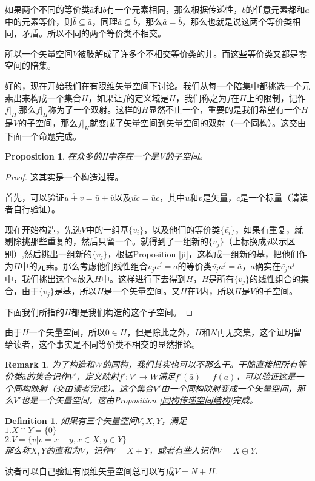 \documentclass[11pt,a4paper,openany]{book}%
\theoremstyle{plain}%
\newtheorem{pro}{Proposition}[chapter]%
\newtheorem*{rem}{Remark}%
\newtheorem{defi}{Definition}[chapter]%
\begin{document}
如果两个不同的等价类$\bar{a}$和$\bar{b}$有一个元素相同，那么根据传递性，$b$的任意元素都和$a$中的元素等价，则$\bar{b}\subseteq \bar{a}$，同理$\bar{a}\subseteq \bar{b}$，那么$\bar{a}=\bar{b}$，那么也就是说这两个等价类相同，矛盾。所以不同的两个等价类不相交。

所以一个矢量空间$V$被肢解成了许多个不相交等价类的并。而这些等价类又都是零空间的陪集。

好的，现在开始我们在有限维矢量空间下讨论。我们从每一个陪集中都挑选一个元素出来构成一个集合$H$，如果让$f$的定义域是$H$，我们称之为$f$在$H$上的限制，记作$f|_H$.那么$f|_H$称为了一个双射。这样的$H$显然不止一个，重要的是我们希望有一个$H$是$V$的子空间，那么$f|_H$就变成了矢量空间到矢量空间的双射（一个同构）。这交由下面一个命题完成。
\begin{pro}
在众多的H中存在一个是V的子空间。
\label{a-1}
\end{pro}
\begin{proof}
这其实是一个构造过程。

首先，可以验证$\overline{u+v}=\bar{u}+\bar{v}$以及$\overline{uc}=\bar{u}c$，其中$u$和$v$是矢量，$c$是一个标量（请读者自行验证）。

现在开始构造，先选$V$中的一组基$\{v_i\}$，以及他们的等价类$\{\bar{v_i}\}$，如果有重复，就剔除挑那些重复的，然后只留一个。就得到了一组新的$\{\bar{v_j}\}$（上标换成$j$以示区别）,然后挑出一组新的$\{v_j\}$，根据Proposition \ref{ji}，这构成一组新的基，把他们作为$H$中的元素。那么考虑他们线性组合$v_ja^j=a$的等价类$\bar{v_j}a^j=\bar{a}$，$a$确实在$\bar{v_j}a^j$中，我们挑出这个$a$放入$H$中。这样进行下去得到$H$，$H$是所有$\{v_j\}$的线性组合的集合，由于$\{v_j\}$是基，所以$H$是一个矢量空间。又$H$在$V$内，所以$H$是$V$的子空间。

下面我们所指的$H$都是我们构造的这个子空间。
\end{proof}
由于$H$一个矢量空间，所以$0 \in H$，但是除此之外，$H$和$N$再无交集，这个证明留给读者，这个事实是不同等价类不相交的显然推论。
\begin{rem}
为了构造和$W$的同构，我们其实也可以不那么干。干脆直接把所有等价类$\bar{a}$的集合记作$V'$，定义映射$f':V'\rightarrow W$满足$f'(\bar{a})=f(a)$，可以验证这是一个同构映射（交由读者完成）。这个集合$V'$由一个同构映射变成一个矢量空间，那么$V'$也是一个矢量空间，这由Proposition \ref{同构传递空间结构}完成。
\end{rem}
\begin{defi}
如果有三个矢量空间$V,X,Y$，满足\\
$1.$$X\cap Y=\{0\}$\\
$2.$$V=\{v|v=x+y,x\in X,y \in Y\}$\\
那么称$X,Y$的直和为$V$，记作$V=X+Y$，或者有些人记作$V=X\oplus Y$.
\end{defi}
读者可以自己验证有限维矢量空间总可以写成$V=N+H$.
\end{document}
